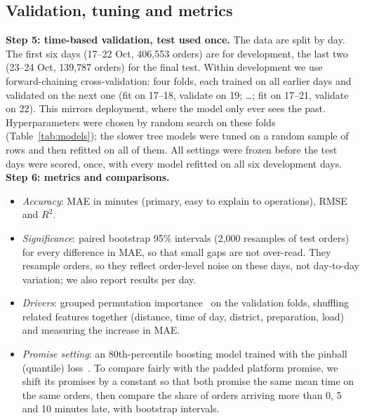 \subsection{Validation, tuning and metrics}
\textbf{Step 5: time-based validation, test used once.} The data are split by day. The first six days
(17--22 Oct, 406{,}553 orders) are for development, the last two (23--24 Oct, 139{,}787 orders) for the
final test. Within development we use forward-chaining cross-validation: four folds, each trained on
all earlier days and validated on the next one (fit on 17--18, validate on 19; \ldots; fit on 17--21,
validate on 22). This mirrors deployment, where the model only ever sees the past. Hyperparameters were
chosen by random search on these folds (Table~\ref{tab:models}); the slower tree models were tuned on a
random sample of rows and then refitted on all of them. All settings were
frozen before the test days were scored, once, with every model refitted on all six development days.
\textbf{Step 6: metrics and comparisons.}
\begin{itemize}
  \item \emph{Accuracy}: MAE in minutes (primary, easy to explain to operations), RMSE and $R^2$.
  \item \emph{Significance}: paired bootstrap 95\% intervals (2{,}000 resamples of test orders) for every
        difference in MAE, so that small gaps are not over-read. They resample orders, so they reflect
        order-level noise on these days, not day-to-day variation; we also report results per day.
  \item \emph{Drivers}: grouped permutation importance~\cite{breiman2001random} on the validation folds,
        shuffling related features together (distance, time of day, district, preparation, load) and
        measuring the increase in MAE.
  \item \emph{Promise setting}: an 80th-percentile boosting model trained with the pinball (quantile)
        loss~\cite{koenker1978quantiles}. To compare fairly with the padded platform promise, we shift
        its promises by a constant so that both promise the same mean time on the same orders, then
        compare the share of orders arriving more than 0, 5 and 10 minutes late, with bootstrap
        intervals.
\end{itemize}

